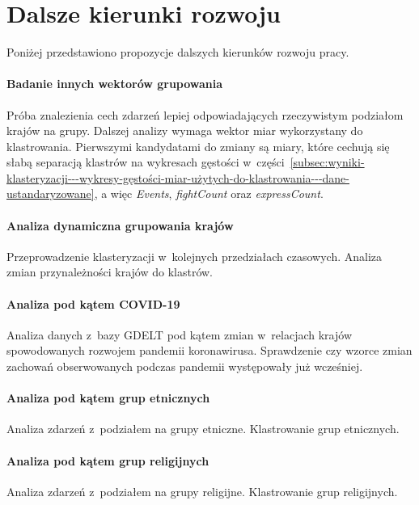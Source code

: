 \documentclass[11pt]{report}
\begin{document}
    \section{Dalsze kierunki rozwoju}\label{sec:dalsze-kierunki-rozwoju}
    Poniżej przedstawiono propozycje dalszych kierunków rozwoju pracy.

    \paragraph{Badanie innych wektorów grupowania}
    Próba znalezienia cech zdarzeń lepiej odpowiadających rzeczywistym podziałom krajów na grupy.
    Dalszej analizy wymaga wektor miar wykorzystany do klastrowania.
    Pierwszymi kandydatami do zmiany są miary, które cechują się słabą separacją klastrów na wykresach gęstości w~części~\ref{subsec:wyniki-klasteryzacji---wykresy-gęstości-miar-użytych-do-klastrowania---dane-ustandaryzowane}, a więc \textit{Events}, \textit{fightCount} oraz \textit{expressCount}.

    \paragraph{Analiza dynamiczna grupowania krajów}
    Przeprowadzenie klasteryzacji w~kolejnych przedziałach czasowych.
    Analiza zmian przynależności krajów do klastrów.

    \paragraph{Analiza pod kątem COVID-19}
    Analiza danych z~bazy GDELT pod kątem zmian w~relacjach krajów spowodowanych rozwojem pandemii koronawirusa.
    Sprawdzenie czy wzorce zmian zachowań obserwowanych podczas pandemii występowały już wcześniej.

    \paragraph{Analiza pod kątem grup etnicznych}
    Analiza zdarzeń z~podziałem na grupy etniczne.
    Klastrowanie grup etnicznych.

    \paragraph{Analiza pod kątem grup religijnych}
    Analiza zdarzeń z~podziałem na grupy religijne.
    Klastrowanie grup religijnych.

    \appendix
    \newpage
\end{document}
